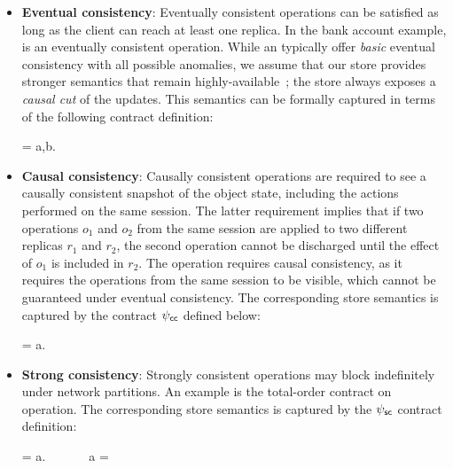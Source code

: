 \begin{itemize}[noitemsep]

\item \textbf{Eventual consistency}: Eventually consistent operations can
	be satisfied as long as the client can reach at least one replica. In the
	bank account example,  is an eventually consistent operation.
	While an \ecds typically offer \emph{basic} eventual consistency with all
	possible anomalies, we assume that our store provides stronger semantics that
	remain highly-available~\cite{BailisHAT,COPS}; the store always exposes a
	\emph{causal cut} of the updates. This semantics can be formally captured in
	terms of the following contract definition:

  \vspace{-1em}
  \begin{smathpar}
  \ecc = \forall a,b. ~ \wedge {} \Rightarrow {}
  \end{smathpar}

\item \textbf{Causal consistency}: Causally consistent operations are required
	to see a causally consistent snapshot of the object state, including the
	actions performed on the same session.  The latter requirement implies that
	if two operations $o_1$ and $o_2$ from the same session are applied to two
	different replicas $r_1$ and $r_2$, the second operation cannot be discharged
	until the effect of $o_1$ is included in $r_2$. The  operation
	requires causal consistency, as it requires the operations from the same
	session to be visible, which cannot be guaranteed under eventual consistency.
	The corresponding store semantics is captured by the contract $\psi_{\sf cc}$ defined
	below:

  \vspace{-1em}
  \begin{smathpar}
  \ccc = \forall a.~ \Rightarrow {}
  \end{smathpar}

\item \textbf{Strong consistency}: Strongly consistent operations may block
  indefinitely under network partitions. An example is the total-order
  contract on  operation. The corresponding store semantics is
	captured by the $\psi_{\sf sc}$ contract definition:

  \vspace{-1em}
  \begin{smathpar}
  \scc = \forall a.~ \Rightarrow {} ~\vee~  ~\vee~ a = \cureff
  \end{smathpar}
\end{itemize}

